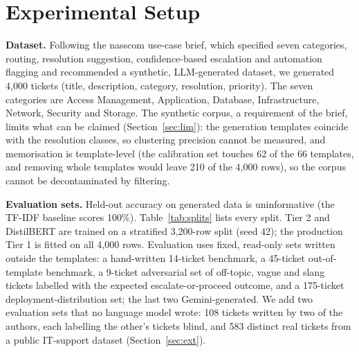 \documentclass[conference,a4paper]{IEEEtran}
\begin{document}
\section{Experimental Setup}\label{sec:setup}

\textbf{Dataset.} Following the nasscom use-case brief, which specified seven categories, routing, resolution suggestion, confidence-based escalation and automation flagging and recommended a synthetic, LLM-generated dataset, we generated 4,000 tickets (title, description, category, resolution, priority). The seven categories are Access Management, Application, Database, Infrastructure, Network, Security and Storage. The synthetic corpus, a requirement of the brief, limits what can be claimed (Section~\ref{sec:lim}): the generation templates coincide with the resolution classes, so clustering precision cannot be measured, and memorisation is template-level (the calibration set touches 62 of the 66 templates, and removing whole templates would leave 210 of the 4,000 rows), so the corpus cannot be decontaminated by filtering.

\textbf{Evaluation sets.} Held-out accuracy on generated data is uninformative (the TF-IDF baseline scores 100\%). Table~\ref{tab:splits} lists every split. Tier 2 and DistilBERT are trained on a stratified 3,200-row split (seed 42); the production Tier 1 is fitted on all 4,000 rows. Evaluation uses fixed, read-only sets written outside the templates: a hand-written 14-ticket benchmark, a 45-ticket out-of-template benchmark, a 9-ticket adversarial set of off-topic, vague and slang tickets labelled with the expected escalate-or-proceed outcome, and a 175-ticket deployment-distribution set; the last two Gemini-generated. We add two evaluation sets that no language model wrote: 108 tickets written by two of the authors, each labelling the other's tickets blind, and 583 distinct real tickets from a public IT-support dataset (Section~\ref{sec:ext}).
\end{document}
